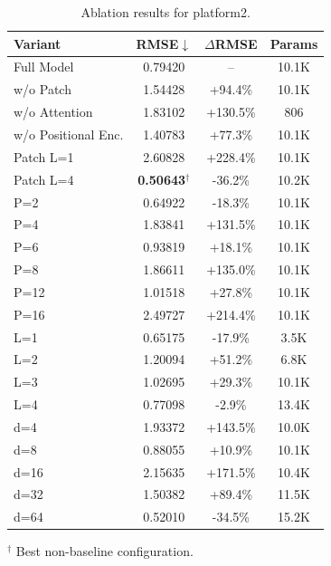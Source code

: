 \begin{table}[t]
\centering
\caption{Ablation results for platform2.}
\label{tab:ablation_platform2}
\scriptsize
\setlength{\tabcolsep}{3pt}
\begin{tabular}{lccc}
\toprule
Variant & RMSE$\downarrow$ & $\Delta$RMSE & Params \\
\midrule
Full Model & 0.79420 & -- & 10.1K \\
\addlinespace[1pt]
w/o Patch & 1.54428 & +94.4\% & 10.1K \\
w/o Attention & 1.83102 & +130.5\% & 806 \\
w/o Positional Enc. & 1.40783 & +77.3\% & 10.1K \\
\addlinespace[1pt]
Patch L=1 & 2.60828 & +228.4\% & 10.1K \\
Patch L=4 & \textbf{0.50643}$^\dagger$ & -36.2\% & 10.2K \\
\addlinespace[1pt]
P=2 & 0.64922 & -18.3\% & 10.1K \\
P=4 & 1.83841 & +131.5\% & 10.1K \\
P=6 & 0.93819 & +18.1\% & 10.1K \\
P=8 & 1.86611 & +135.0\% & 10.1K \\
P=12 & 1.01518 & +27.8\% & 10.1K \\
P=16 & 2.49727 & +214.4\% & 10.1K \\
\addlinespace[1pt]
L=1 & 0.65175 & -17.9\% & 3.5K \\
L=2 & 1.20094 & +51.2\% & 6.8K \\
L=3 & 1.02695 & +29.3\% & 10.1K \\
L=4 & 0.77098 & -2.9\% & 13.4K \\
\addlinespace[1pt]
d=4 & 1.93372 & +143.5\% & 10.0K \\
d=8 & 0.88055 & +10.9\% & 10.1K \\
d=16 & 2.15635 & +171.5\% & 10.4K \\
d=32 & 1.50382 & +89.4\% & 11.5K \\
d=64 & 0.52010 & -34.5\% & 15.2K \\
\bottomrule
\end{tabular}
\vspace{2pt}
\raggedright\footnotesize $^\dagger$ Best non-baseline configuration.
\end{table}
